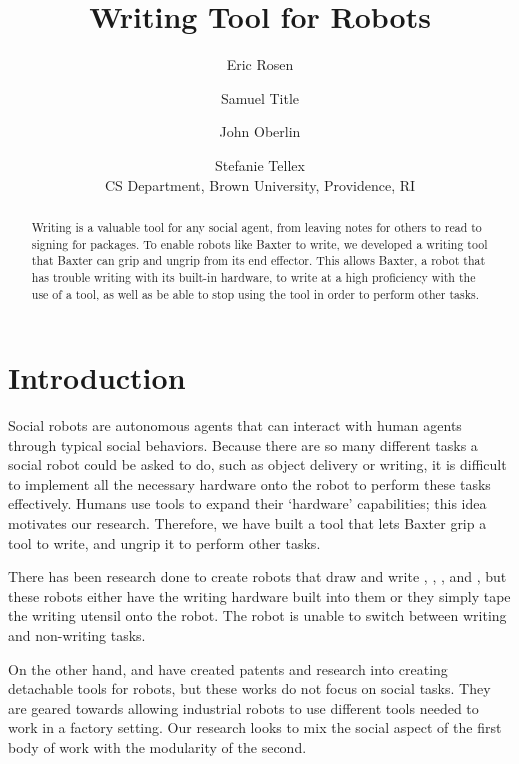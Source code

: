 \documentclass[letterpaper]{article}
\title{Writing Tool for Robots}
\author{Eric Rosen \and Samuel Title \and John Oberlin \and Stefanie Tellex\\
CS Department, Brown University, Providence, RI\\}
\begin{document}
\maketitle

%

\begin{abstract}
Writing is a valuable tool for any social agent, from leaving notes for others to read to signing for packages. To enable robots like Baxter to write, we developed a writing tool that Baxter can grip and ungrip from its end effector. This allows Baxter, a robot that has trouble writing with its built-in hardware, to write at a high proficiency with the use of a tool, as well as be able to stop using the tool in order to perform other tasks.
\end{abstract}

\section{Introduction}
Social robots are autonomous agents that can interact with human agents through typical social behaviors. Because there are so many different tasks a social robot could be asked to do, such as object delivery or writing, it is difficult to implement all the necessary hardware onto the robot to perform these tasks effectively. Humans use tools to expand their `hardware' capabilities; this idea motivates our research. Therefore, we have built a tool that lets Baxter grip a tool to write, and ungrip it to perform other tasks.

There has been research done to create robots that draw and write \cite{calinon2005humanoid}, \cite{caballero2014development}, \cite{ex66-3}, \cite{ex67-3} and \cite{ex67-3}, but these robots either have the writing hardware built into them or they simply tape the writing utensil onto the robot. The robot is unable to switch between writing and non-writing tasks.

On the other hand, \cite{hutchinson1991novel} and \cite{ex65-3} have created patents and research into creating detachable tools for robots, but these works do not focus on social tasks. They are geared towards allowing industrial robots to use different tools needed to work in a factory setting. Our research looks to mix the social aspect of the first body of work with the modularity of the second.
\end{document}
